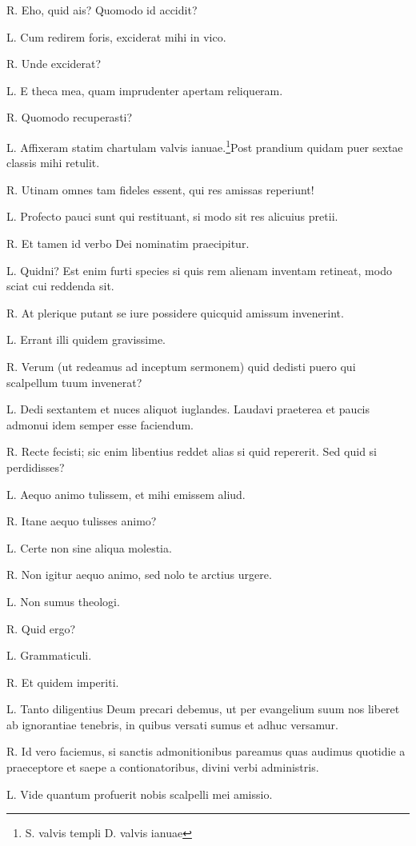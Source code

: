 \documentclass{article}
\begin{document}
R. Eho, quid ais? Quomodo id accidit?

L. Cum redirem foris, exciderat mihi in vico. 

R. Unde exciderat?

L. E theca mea, quam imprudenter apertam reliqueram. 

R. Quomodo recuperasti?

L. Affixeram statim chartulam valvis ianuae.\footnote{S. valvis templi D. valvis ianuae}Post prandium quidam puer sextae classis mihi retulit. 

R. Utinam omnes tam fideles essent, qui res amissas reperiunt!

L. Profecto pauci sunt qui restituant, si modo sit res alicuius pretii. 

R. Et tamen id verbo Dei nominatim praecipitur. 

L. Quidni? Est enim furti species si quis rem alienam inventam retineat, modo sciat cui reddenda sit. 

R. At plerique putant se iure possidere quicquid amissum invenerint. 

L. Errant illi quidem gravissime. 

R. Verum (ut redeamus ad inceptum sermonem) quid dedisti puero qui scalpellum tuum invenerat?

L. Dedi sextantem et nuces aliquot iuglandes. Laudavi praeterea et paucis admonui idem semper esse faciendum. 

R. Recte fecisti; sic enim libentius reddet alias si quid repererit. Sed quid si perdidisses?

L. Aequo animo tulissem, et mihi emissem aliud. 

R. Itane aequo tulisses animo?

L. Certe non sine aliqua molestia. 

R. Non igitur aequo animo, sed nolo te arctius urgere. 

L. Non sumus theologi. 

R. Quid ergo?

L. Grammaticuli. 

R. Et quidem imperiti. 

L. Tanto diligentius Deum precari debemus, ut per evangelium suum nos liberet ab ignorantiae tenebris, in quibus versati sumus et adhuc versamur. 

R. Id vero faciemus, si sanctis admonitionibus pareamus quas audimus quotidie a praeceptore et saepe a contionatoribus, divini verbi administris. 

L. Vide quantum profuerit nobis scalpelli mei amissio. 
\end{document}
